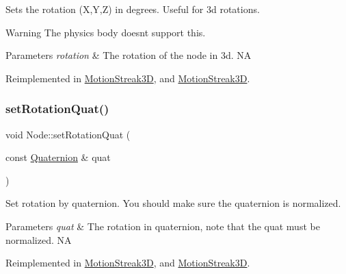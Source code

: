Sets the rotation (X,Y,Z) in degrees. Useful for 3d rotations.

\begin{DoxyWarning}{Warning}
The physics body doesn\textquotesingle{}t support this.
\end{DoxyWarning}

\begin{DoxyParams}{Parameters}
{\em rotation} & The rotation of the node in 3d.  NA \\
\hline
\end{DoxyParams}


Reimplemented in \hyperlink{classMotionStreak3D_a6ef719a2412711e81c3bfc40ce53c3e2}{Motion\+Streak3D}, and \hyperlink{classMotionStreak3D_abe4bc651d6ce068c366edc18cb0aaead}{Motion\+Streak3D}.

\mbox{\label{classNode_a59c0b9e9afc4668320d90c340e5727e7}} 
\subsubsection{\texorpdfstring{set\+Rotation\+Quat()}{setRotationQuat()}\hspace{0.1cm}{\footnotesize\ttfamily [1/2]}}
{\footnotesize\ttfamily void Node\+::set\+Rotation\+Quat (\begin{DoxyParamCaption}\item[{const \hyperlink{classQuaternion}{Quaternion} \&}]{quat }\end{DoxyParamCaption})\hspace{0.3cm}{\ttfamily [virtual]}}

Set rotation by quaternion. You should make sure the quaternion is normalized.


\begin{DoxyParams}{Parameters}
{\em quat} & The rotation in quaternion, note that the quat must be normalized.  NA \\
\hline
\end{DoxyParams}


Reimplemented in \hyperlink{classMotionStreak3D_a7e9e94bce7204f28d6b8dff196d163d9}{Motion\+Streak3D}, and \hyperlink{classMotionStreak3D_ab3b762bdfe6cbda5cda6b69ca8d31845}{Motion\+Streak3D}.

\mbox{\label{classNode_a3da11f365bd691d42161cca0c729e5e5}} 
